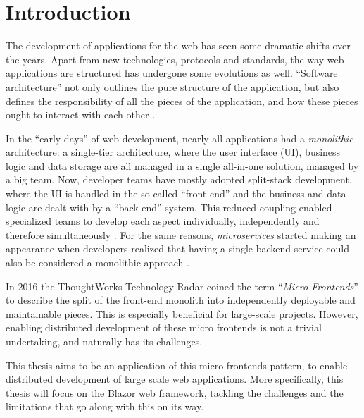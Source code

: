 
\section{Introduction}
\label{sec:introduction}


The development of applications for the web has seen some dramatic shifts over
the years. Apart from new technologies, protocols and standards, the way web
applications are structured has undergone some evolutions as well. ``Software
architecture'' not only outlines the pure structure of the application, but also
defines the responsibility of all the pieces of the application, and how these
pieces ought to interact with each other \autocite{Fedorov_etal_1998}.

In the ``early days'' of web development, nearly all applications had a
\textit{monolithic} architecture: a single-tier architecture, where the user
interface (UI), business logic and data storage are all managed in a single
all-in-one solution, managed by a big team. Now, developer teams have mostly
adopted split-stack development, where the UI is handled in the so-called
``front end'' and the business and data logic are dealt with by a ``back end''
system. This reduced coupling enabled specialized teams to develop each aspect
individually, independently and therefore simultaneously
\autocite{Dunkley_2016}. For the same reasons, \textit{microservices} started
making an appearance when developers realized that having a single backend
service could also be considered a monolithic approach
\autocite{Fowler_Microservices_2014}.

In 2016 the ThoughtWorks Technology Radar \autocite{ThoughtWorks_2020} coined
the term ``\textit{Micro Frontends}'' to describe the split of the front-end
monolith into independently deployable and maintainable pieces. This is
especially beneficial for large-scale projects. However, enabling distributed
development of these micro frontends is not a trivial undertaking, and naturally
has its challenges.

This thesis aims to be an application of this micro frontends pattern, to enable
distributed development of large scale web applications. More specifically, this
thesis will focus on the Blazor web framework, tackling the challenges and the
limitations that go along with this on its way.


